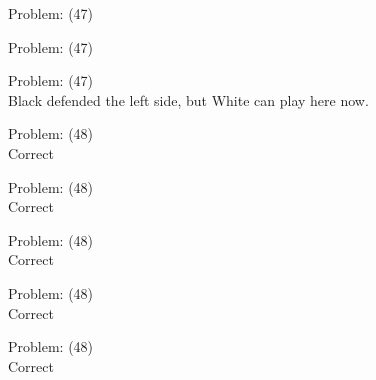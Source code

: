 \documentclass[11pt]{article}
\begin{document}
\begin{minipage}[t]{0.5\textwidth}
  {\centering
  
  Problem: (47)\\
  
  }
\end{minipage}
\begin{minipage}[t]{0.5\textwidth}
  {\centering
  
  Problem: (47)\\
  
  }
\end{minipage}
\begin{minipage}[t]{0.5\textwidth}
  {\centering
  
  Problem: (47)\\
  Black defended the left side, but White can play here now.\\
  }
\end{minipage}
\begin{minipage}[t]{0.5\textwidth}
  {\centering
  
  Problem: (48)\\
  Correct\\
  }
\end{minipage}
\begin{minipage}[t]{0.5\textwidth}
  {\centering
  
  Problem: (48)\\
  Correct\\
  }
\end{minipage}
\begin{minipage}[t]{0.5\textwidth}
  {\centering
  
  Problem: (48)\\
  Correct\\
  }
\end{minipage}
\begin{minipage}[t]{0.5\textwidth}
  {\centering
  
  Problem: (48)\\
  Correct\\
  }
\end{minipage}
\begin{minipage}[t]{0.5\textwidth}
  {\centering
  
  Problem: (48)\\
  Correct\\
  }
\end{minipage}
\end{document}
